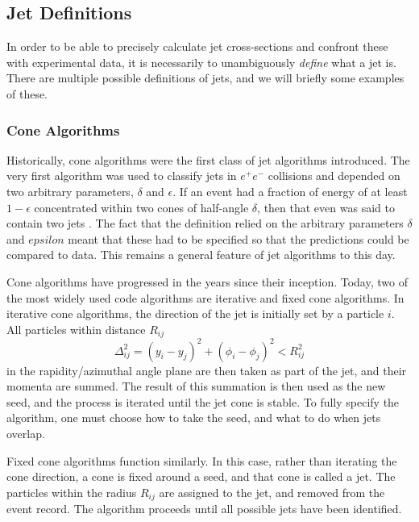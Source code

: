 \documentclass[10pt,a4paper]{book}
\begin{document}
\subsection{Jet Definitions}
In order to be able to precisely calculate jet cross-sections and confront these with experimental data, it is necessarily to unambiguously \emph{define} what a jet is. There are multiple possible definitions of jets, and we will briefly some examples of these.  

\subsubsection{Cone Algorithms}
Historically, cone algorithms were the first class of jet algorithms introduced. The very first algorithm was used to classify jets in $e^+e^-$ collisions and depended on two arbitrary parameters, $\delta$ and $\epsilon$. If an event had a fraction of energy of at least $1 - \epsilon$ concentrated within two cones of half-angle $\delta$, then that even was said to contain two jets \cite{Sterman:1977wj}. The fact that the definition relied on the arbitrary parameters $\delta$ and $epsilon$ meant that these had to be specified so that the predictions could be compared to data. This remains a general feature of jet algorithms to this day.

Cone algorithms have progressed in the years since their inception. Today, two of the most widely used code algorithms are iterative and fixed cone algorithms. In iterative cone algorithms, the direction of the jet is initially set by a particle $i$. All particles within distance $R_{ij}$
\begin{equation}
\Delta_{ij}^2 = (y_i - y_j)^2 + (\phi_i - \phi_j)^2 < R_{ij}^2 
\end{equation}
in the rapidity/azimuthal angle plane are then taken as part of the jet, and their momenta are summed. The result of this summation is then used as the new seed, and the process is iterated until the jet cone is stable. To fully specify the algorithm, one must choose how to take the seed, and what to do when jets overlap. 

Fixed cone algorithms function similarly. In this case, rather than iterating the cone direction, a cone is fixed around a seed, and that cone is called a jet. The particles within the radius $R_{ij}$ are assigned to the jet, and removed from the event record. The algorithm proceeds until all possible jets have been identified.
\end{document}
